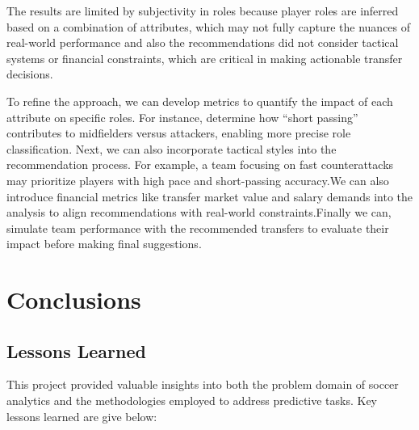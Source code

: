 \documentclass{article}
\begin{document}
The results are limited by subjectivity in roles because player roles are inferred based on a combination of attributes, which may not fully capture the nuances of real-world performance and also the recommendations did not consider tactical systems or financial constraints, which are critical in making actionable transfer decisions.

To refine the approach, we can develop metrics to quantify the impact of each attribute on specific roles. For instance, determine how “short passing” contributes to midfielders versus attackers, enabling more precise role classification. Next, we can also incorporate tactical styles into the recommendation process. For example, a team focusing on fast counterattacks may prioritize players with high pace and short-passing accuracy.We can also introduce financial metrics like transfer market value and salary demands into the analysis to align recommendations with real-world constraints.Finally we can, simulate team performance with the recommended transfers to evaluate their impact before making final suggestions.

\section{Conclusions}

\subsection{Lessons Learned}

This project provided valuable insights into both the problem domain of soccer analytics and the methodologies employed to address predictive tasks. Key lessons learned are give below:
\end{document}
